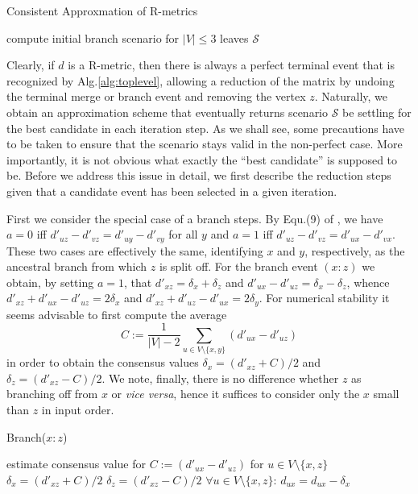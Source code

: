 \documentclass{article}
\begin{document}
\begin{algorithm}[H]
\caption{Consistent Approxmation of R-metrics}
\label{alg:toplevel}
\SetAlgoLined
{}
compute initial branch scenario for $|V|\le 3$ leaves\;
\Return $\mathcal{S}$ 
\end{algorithm} 

Clearly, if $d$ is a R-metric, then there is always a perfect terminal
event that is recognized by Alg.\ref{alg:toplevel}, allowing a reduction of
the matrix by undoing the terminal merge or branch event and removing the
vertex $z$. Naturally, we obtain an approximation scheme that eventually
returns scenario $\mathcal{S}$ be settling for the best candidate in each
iteration step. As we shall see, some precautions have to be taken to
ensure that the scenario stays valid in the non-perfect case. More
importantly, it is not obvious what exactly the ``best candidate'' is
supposed to be. Before we address this issue in detail, we first describe
the reduction steps given that a candidate event has been selected in a
given iteration.

First we consider the special case of a branch steps. By Equ.(9) of
\cite{Prohaska:17a}, we have $a=0$ iff $d'_{uz}-d'_{vz} = d'_{uy}-d'_{vy}$
for all $y$ and $a=1$ iff $d'_{uz}-d'_{vz} = d'_{ux}-d'_{vx}$. These two
cases are effectively the same, identifying $x$ and $y$, respectively, as
the ancestral branch from which $z$ is split off. For the branch event
$(x:z)$ we obtain, by setting $a=1$, that $d'_{xz}=\delta_x+\delta_z$ and
$d'_{ux}-d'_{uz}=\delta_x-\delta_z$, whence
$d'_{xz}+d'_{ux}-d'_{uz}=2\delta_x$ and
$d'_{xz}+d'_{uz}-d'_{ux}=2\delta_y$. For numerical stability it seems
advisable to first compute the average
\begin{equation} 
  C := \frac{1}{|V|-2} \sum_{u\in V\setminus\{x,y\}} (d'_{ux}-d'_{uz})
\end{equation} 
in order to obtain the consensus values $\delta_x = (d'_{xz}+C)/2$ and
$\delta_z = (d'_{xz}-C)/2$.  We note, finally, there is no difference
whether $z$ as branching off from $x$ or \textit{vice versa}, hence it
suffices to consider only the $x$ small than $z$ in input order. 

\begin{algorithm}[H]
\caption{Branch($x:z$)} 
\label{alg:branchstep}
\SetAlgoLined
estimate consensus value for $C:=(d'_{ux}-d'_{uz})$ for $u\in
V\setminus\{x,z\}$ \;
$\delta_x = (d'_{xz}+C)/2$\;
$\delta_z = (d'_{xz}-C)/2$\;
$\forall u\in V\setminus\{x,z\}$: $d_{ux} =  d_{ux}-\delta_x$\;
\end{algorithm} 
\end{document}
